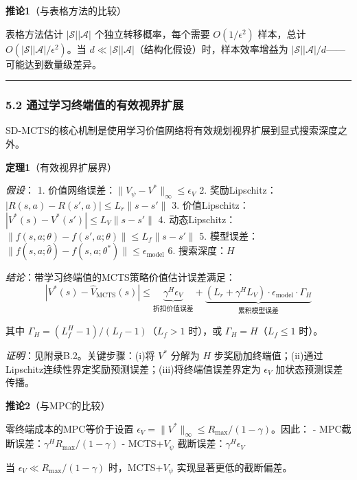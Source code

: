 \documentclass[UTF8]{ctexart}
\begin{document}
\textbf{推论1}（与表格方法的比较）

表格方法估计 \(|\mathcal{S}||\mathcal{A}|\) 个独立转移概率，每个需要
\(O(1/\epsilon^2)\) 样本，总计
\(O(|\mathcal{S}||\mathcal{A}|/\epsilon^2)\)。当
\(d \ll |\mathcal{S}||\mathcal{A}|\)（结构化假设）时，样本效率增益为
\(|\mathcal{S}||\mathcal{A}|/d\)------可能达到数量级差异。

\begin{center}\rule{0.5\linewidth}{0.4pt}\end{center}

\hypertarget{ux901aux8fc7ux5b66ux4e60ux7ec8ux7aefux503cux7684ux6709ux6548ux89c6ux754cux6269ux5c55}{%
\subsubsection{5.2
通过学习终端值的有效视界扩展}\label{ux901aux8fc7ux5b66ux4e60ux7ec8ux7aefux503cux7684ux6709ux6548ux89c6ux754cux6269ux5c55}}

SD-MCTS的核心机制是使用学习价值网络将有效规划视界扩展到显式搜索深度之外。

\textbf{定理1}（有效视界扩展界）

\emph{假设}： 1.
价值网络误差：\(\|V_\psi - V^*\|_\infty \leq \epsilon_V\) 2.
奖励Lipschitz：\(|R(s,a) - R(s',a)| \leq L_r \|s - s'\|\) 3.
价值Lipschitz：\(|V^*(s) - V^*(s')| \leq L_V \|s - s'\|\) 4.
动态Lipschitz：\(\|f(s,a;\theta) - f(s',a;\theta)\| \leq L_f \|s - s'\|\)
5.
模型误差：\(\|f(s,a;\hat{\theta}) - f(s,a;\theta^*)\| \leq \epsilon_{\text{model}}\)
6. 搜索深度：\(H\)

\emph{结论}：带学习终端值的MCTS策略价值估计误差满足：
\[|V^*(s) - \hat{V}_{\text{MCTS}}(s)| \leq \underbrace{\gamma^H \epsilon_V}_{\text{折扣价值误差}} + \underbrace{(L_r + \gamma^H L_V) \cdot \epsilon_{\text{model}} \cdot \Gamma_H}_{\text{累积模型误差}}\]

其中 \(\Gamma_H = (L_f^H - 1)/(L_f - 1)\)（\(L_f > 1\) 时），或
\(\Gamma_H = H\)（\(L_f \leq 1\) 时）。

\emph{证明}：见附录B.2。关键步骤：(i)将 \(V^*\) 分解为 \(H\)
步奖励加终端值；(ii)通过Lipschitz连续性界定奖励预测误差；(iii)将终端值误差界定为
\(\epsilon_V\) 加状态预测误差传播。

\textbf{推论2}（与MPC的比较）

零终端成本的MPC等价于设置
\(\epsilon_V = \|V^*\|_\infty \leq R_{\max}/(1-\gamma)\)。因此： -
MPC截断误差：\(\gamma^H R_{\max}/(1-\gamma)\) - MCTS+\(V_\psi\)
截断误差：\(\gamma^H \epsilon_V\)

当 \(\epsilon_V \ll R_{\max}/(1-\gamma)\) 时，MCTS+\(V_\psi\)
实现显著更低的截断偏差。
\end{document}
